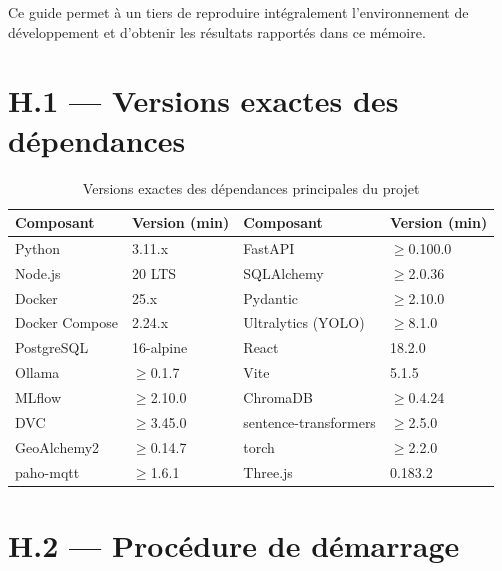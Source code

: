 Ce guide permet à un tiers de reproduire intégralement l'environnement de développement
et d'obtenir les résultats rapportés dans ce mémoire.

\section*{H.1 — Versions exactes des dépendances}

\begin{table}[H]
\centering
\caption{Versions exactes des dépendances principales du projet}
\label{tab:versions}
\begin{tabular}{llll}
\toprule
\textbf{Composant} & \textbf{Version (min)} & \textbf{Composant} & \textbf{Version (min)} \\
\midrule
Python         & 3.11.x            & FastAPI            & $\geq$0.100.0 \\
Node.js        & 20 LTS            & SQLAlchemy         & $\geq$2.0.36 \\
Docker         & 25.x              & Pydantic           & $\geq$2.10.0 \\
Docker Compose & 2.24.x            & Ultralytics (YOLO) & $\geq$8.1.0 \\
PostgreSQL     & 16-alpine         & React              & 18.2.0 \\
Ollama         & $\geq$0.1.7       & Vite               & 5.1.5 \\
MLflow         & $\geq$2.10.0      & ChromaDB           & $\geq$0.4.24 \\
DVC            & $\geq$3.45.0      & sentence-transformers & $\geq$2.5.0 \\
GeoAlchemy2    & $\geq$0.14.7      & torch              & $\geq$2.2.0 \\
paho-mqtt      & $\geq$1.6.1       & Three.js           & 0.183.2 \\
\bottomrule
\end{tabular}
\end{table}

\section*{H.2 — Procédure de démarrage}

